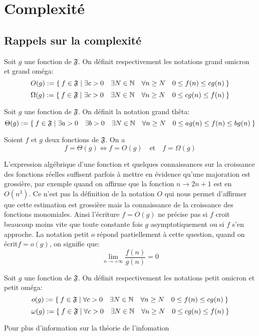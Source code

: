 \section{Complexité}
\subsection{Rappels sur la complexité}
\begin{defi}
   Soit $g$ une fonction de $\mathfrak{F}$. On définit respectivement les notations grand omicron et grand oméga:
   \[
   O(g) := \Set{f \in \mathfrak{F} | \exists c>0\quad \exists N \in \mathbb{N}\quad
     \forall n \geq N \quad 0 \leq f(n) \leq cg(n)}
   \]
   \[
   \Omega(g) := \Set{f \in \mathfrak{F} | \exists c>0\quad \exists N \in \mathbb{N}\quad
     \forall n \geq N \quad 0 \leq cg(n) \leq  f(n) }
   \]
\end{defi}
\begin{defi}
   Soit $g$ une fonction de $\mathfrak{F}$. On définit la notation grand thêta:
   \[
   \Theta(g) := \Set{f \in \mathfrak{F} |\exists a>0 \quad \exists b>0\quad \exists N \in \mathbb{N}\quad
     \forall n \geq N \quad 0 \leq ag(n) \leq  f(n) \leq bg(n) }
   \]
\end{defi}
\begin{prop}
  Soient $f$ et $g$ deux fonctions de $\mathfrak{F}$. On a
  \[
  f = \Theta(g) \iff f = O(g) \quad \text{et} \quad f = \Omega(g)
  \]
\end{prop}
L'expression algébrique d'une fonction et quelques connaissances sur la croissance des fonctions réelles suffisent parfois à mettre en évidence qu'une majoration est grossière, par exemple quand on affirme que la fonction $n\to 2n+1$ est en $O(n^3)$.
Ce n'est pas la définition de la notation $O$ qui nous permet d'affirmer que cette estimation est grossière mais la connaissance de la croissance des fonctions monomiales.
Ainsi l'écriture $f=O(g)$ ne précise pas si $f$ croit beaucoup moins vite que toute constante fois $g$ asymptotiquement ou si $f$ s'en approche.
La notation petit $o$ répond partiellement à cette question, quand on écrit$f=o(g)$,
on signifie que:
\[
\lim_{n \to + \infty}\frac{f(n)}{g(n)} = 0
\]
\begin{defi}
  Soit $g$ une fonction de $\mathfrak{F}$. On définit respectivement les
  notations petit omicron et petit oméga:
   \[
   o(g) := \Set{f \in \mathfrak{F} | \forall c>0\quad \exists N \in \mathbb{N}\quad
     \forall n \geq N \quad 0 \leq f(n) \leq cg(n)}
   \]
   \[
   \omega(g) := \Set{f \in \mathfrak{F} | \forall c>0\quad \exists N \in \mathbb{N}\quad
     \forall n \geq N \quad 0 \leq cg(n) \leq  f(n) }
   \]
\end{defi}
Pour plus d'information sur la théorie de l'infomation~\cite{zanotti.complex}
